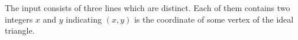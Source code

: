The input consists of three lines which are distinct.
Each of them contains two integers $x$ and $y$ indicating $(x,y)$ is the coordinate of some vertex of the ideal triangle.
